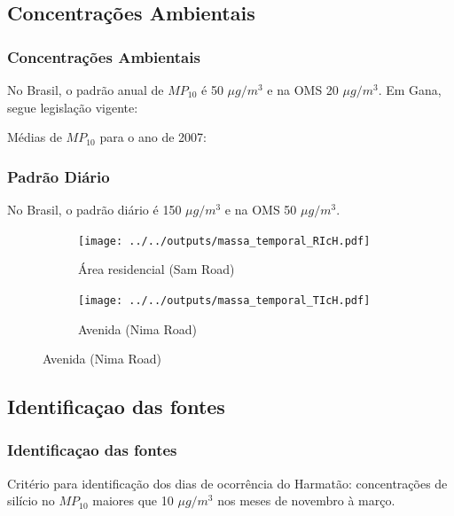 \subsection{Concentrações Ambientais}
\begin{frame}
  \frametitle{Concentrações Ambientais}
  No Brasil, o padrão anual de $MP_{10}$ é 50 $\mu g/m^3$ e na OMS 20 $\mu g/m^3$. Em Gana, segue legislação vigente:
  \begin{table}[H]
  \centering
  \tiny 
    
  \end{table}
%    
Médias de $MP_{10}$ para o ano de 2007:
  \begin{table}[H]
    \centering
    \tiny 
    
  \end{table}
\end{frame}

\begin{frame}
  \frametitle{Padrão Diário}
    No Brasil, o padrão diário é
    150 $\mu g/m^3$ e na OMS 50 $\mu g/m^3$.
  \begin{figure}[H]
    \centering
    \begin{subfigure}[b]{0.45\textwidth}
      \texttt{[image: ../../outputs/massa\_temporal\_RIcH.pdf]}
      \caption{Área residencial (Sam Road)}
    \end{subfigure}%
    \begin{subfigure}[b]{0.45\textwidth}
      \texttt{[image: ../../outputs/massa\_temporal\_TIcH.pdf]}
      \caption{Avenida (Nima Road)}
    \end{subfigure}
  \end{figure}
\end{frame}

\subsection{Identificaçao das fontes}
\begin{frame}
  \frametitle{Identificaçao das fontes}
  
\begin{tcolorbox}[colback=blue!5,colframe=blue!40!black,title=Harmatão]
  Critério para identificação dos dias de ocorrência do Harmatão:
  concentrações de silício no $MP_{10}$ maiores que 10 $\mu g/m^3$ nos  meses de novembro à março. 
\end{tcolorbox}
\end{frame}

